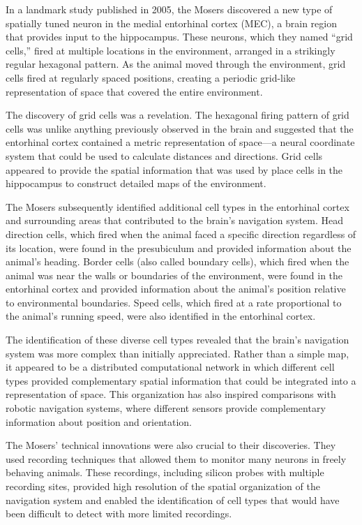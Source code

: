 In a landmark study published in 2005, the Mosers discovered a new type of spatially tuned neuron in the medial entorhinal cortex (MEC), a brain region that provides input to the hippocampus. These neurons, which they named ``grid cells,'' fired at multiple locations in the environment, arranged in a strikingly regular hexagonal pattern. As the animal moved through the environment, grid cells fired at regularly spaced positions, creating a periodic grid-like representation of space that covered the entire environment.

The discovery of grid cells was a revelation. The hexagonal firing pattern of grid cells was unlike anything previously observed in the brain and suggested that the entorhinal cortex contained a metric representation of space---a neural coordinate system that could be used to calculate distances and directions. Grid cells appeared to provide the spatial information that was used by place cells in the hippocampus to construct detailed maps of the environment.

The Mosers subsequently identified additional cell types in the entorhinal cortex and surrounding areas that contributed to the brain's navigation system. Head direction cells, which fired when the animal faced a specific direction regardless of its location, were found in the presubiculum and provided information about the animal's heading. Border cells (also called boundary cells), which fired when the animal was near the walls or boundaries of the environment, were found in the entorhinal cortex and provided information about the animal's position relative to environmental boundaries. Speed cells, which fired at a rate proportional to the animal's running speed, were also identified in the entorhinal cortex.

The identification of these diverse cell types revealed that the brain's navigation system was more complex than initially appreciated. Rather than a simple map, it appeared to be a distributed computational network in which different cell types provided complementary spatial information that could be integrated into a representation of space. This organization has also inspired comparisons with robotic navigation systems, where different sensors provide complementary information about position and orientation.

The Mosers' technical innovations were also crucial to their discoveries. They used recording techniques that allowed them to monitor many neurons in freely behaving animals. These recordings, including silicon probes with multiple recording sites, provided high resolution of the spatial organization of the navigation system and enabled the identification of cell types that would have been difficult to detect with more limited recordings.

